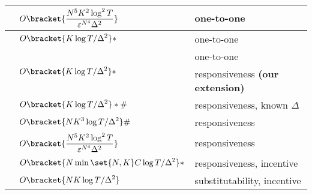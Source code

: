 \begin{table*}[htb!]
\begin{tabular}{lll}
\rule{0pt}{20pt}\citet{kong2022thompson}                                                                                 & $\displaystyle O\bracket{\frac{N^5K^2\log^2 T}{\varepsilon^{N^{4}}\Delta^2}}$                                                       & one-to-one                        \\ \hline
\rule{0pt}{15pt}\citet{zhang2022matching}                                                                                 & $\displaystyle O\bracket{K\log T/\Delta^2}*$                                                       & one-to-one                    \\ \hline
\rule{0pt}{12pt}\multirow{2}{*}{\citet{kong2023player} }& \multirow{2}{*}{$\displaystyle O\bracket{{K\log T}/{\Delta^2}}*$} & one-to-one   \\ &   &  responsiveness \textbf{(our extension)}                         \\\hline
\rule{0pt}{12pt}\multirow{3}{*}{\citet{wang2022bandit}}& $\displaystyle O\bracket{{K\log T}/{\Delta^2}}*\#$ &  responsiveness, known $\Delta$                     \\
  & $\displaystyle O\bracket{{NK^3\log T}/{\Delta^2}}\#$  & responsiveness \\
& {$\displaystyle O\bracket{\frac{N^5K^2\log^2 T}{\varepsilon^{N^{4}}\Delta^2}}$} & responsiveness                        \\ \hline
\rule{0pt}{12pt}\multirow{2}{*}{\textbf{Ours}} & {$\displaystyle O\bracket{{N\min\set{N,K}C\log T}/{\Delta^2}}*$} & responsiveness, incentive 
\\ & $\displaystyle O\bracket{{NK\log T}/{\Delta^2}}$ &  substitutability, incentive
                      \\

          \bottomrule 
\end{tabular}
\end{table*}












